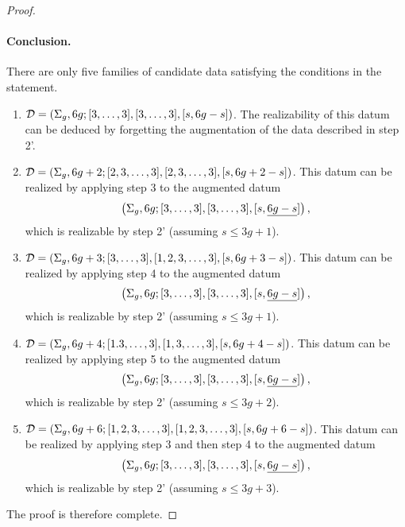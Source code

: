 \documentclass{article}
\begin{document}
\begin{proof}
\paragraph{Conclusion.} There are only five families of candidate data satisfying the conditions in the statement.
\begin{enumerate}
\item $\mathcal{D}=\left(\Sigma_g,6g;[3,\ldots,3],[3,\ldots,3],[s,6g-s]\right)$. The realizability of this datum can be deduced by forgetting the augmentation of the data described in step 2'.
\item $\mathcal{D}=\left(\Sigma_g,6g+2;[2,3,\ldots,3],[2,3,\ldots,3],[s,6g+2-s]\right)$. This datum can be realized by applying step 3 to the augmented datum
\[
\left(\Sigma_g,6g;[3,\ldots,3],[3,\ldots,3],[s,\underline{6g-s}]\right),
\]
which is realizable by step 2' (assuming $s\le 3g+1$).
\item $\mathcal{D}=\left(\Sigma_g,6g+3;[3,\ldots,3],[1,2,3,\ldots,3],[s,6g+3-s]\right)$. This datum can be realized by applying step 4 to the augmented datum
\[
\left(\Sigma_g,6g;[3,\ldots,3],[3,\ldots,3],[s,\underline{6g-s}]\right),
\]
which is realizable by step 2' (assuming $s\le 3g+1$).
\item $\mathcal{D}=\left(\Sigma_g,6g+4;[1.3,\ldots,3],[1,3,\ldots,3],[s,6g+4-s]\right)$. This datum can be realized by applying step 5 to the augmented datum
\[
\left(\Sigma_g,6g;[3,\ldots,3],[3,\ldots,3],[s,\underline{6g-s}]\right),
\]
which is realizable by step 2' (assuming $s\le 3g+2$).
\item $\mathcal{D}=\left(\Sigma_g,6g+6;[1,2,3,\ldots,3],[1,2,3,\ldots,3],[s,6g+6-s]\right)$. This datum can be realized by applying step 3 and then step 4 to the augmented datum
\[
\left(\Sigma_g,6g;[3,\ldots,3],[3,\ldots,3],[s,\underline{6g-s}]\right),
\]
which is realizable by step 2' (assuming $s\le 3g+3$).
\end{enumerate}
The proof is therefore complete.
\end{proof}
\end{document}
